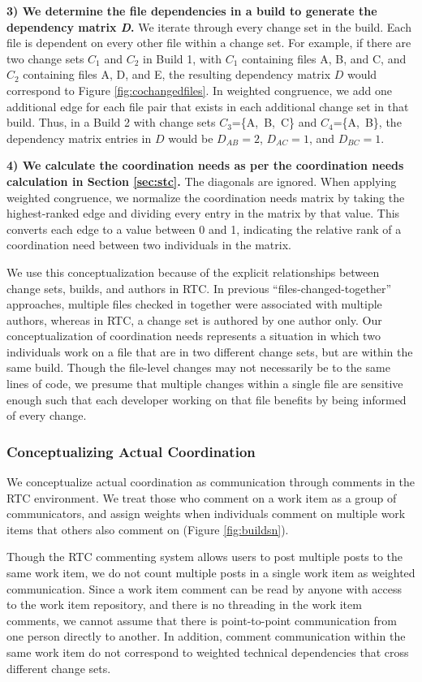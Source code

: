 \textbf{3) We determine the file dependencies in a build to generate the dependency matrix \emph{D}.} We iterate through every change set in the build. Each file is dependent on every other file within a change set. For example, if there are two change sets $C_1$ and $C_2$ in Build 1, with $C_1$ containing files A, B, and C, and $C_2$ containing files A, D, and E, the resulting dependency matrix $D$ would correspond to Figure \ref{fig:cochangedfiles}. In weighted congruence, we add one additional edge for each file pair that exists in each additional change set in that build. Thus, in a Build 2 with change sets $C_3$=\{A,~B,~C\} and $C_4$=\{A,~B\}, the dependency matrix entries in $D$ would be $D_{AB}= 2$, $D_{AC}=1$, and $D_{BC}=1$.

\textbf{4) We calculate the coordination needs as per the coordination needs calculation in Section \ref{sec:stc}.} The diagonals are ignored. When applying weighted congruence, we normalize the coordination needs matrix by taking the highest-ranked edge and dividing every entry in the matrix by that value. This converts each edge to a value between 0 and 1, indicating the relative rank of a coordination need between two individuals in the matrix.

We use this conceptualization because of the explicit relationships between change sets, builds, and authors in RTC. In previous ``files-changed-together'' approaches, multiple files checked in together were associated with multiple authors, whereas in RTC, a change set is authored by one author only. Our conceptualization of coordination needs represents a situation in which two individuals work on a file that are in two different change sets, but are within the same build. Though the file-level changes may not necessarily be to the same lines of code, we presume that multiple changes within a single file are sensitive enough such that each developer working on that file benefits by being informed of every change.

\subsubsection{Conceptualizing Actual Coordination}
We conceptualize actual coordination as communication through comments in the
RTC environment. We treat those who comment on a work item as a group of communicators, and assign weights when individuals comment on multiple work items that others also comment on (Figure \ref{fig:buildsn}).

Though the RTC commenting system allows users to post multiple posts to the same work item, we do not count multiple posts in a single work item as weighted communication.
Since a work item comment can be read by anyone with access to the work item repository, and there is no threading in the work item comments, we cannot assume that there is point-to-point communication from one person directly to another.
In addition, comment communication within the same work item do not correspond to weighted technical dependencies that cross different change sets.

